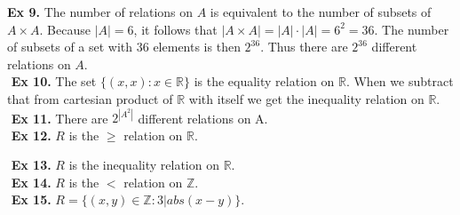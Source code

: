 \documentclass{article}
\begin{document}
\newpage
\noindent \textbf{Ex 9.} The number of relations on $A$ is equivalent to the number of subsets of $A \times A$. Because $|A|=6$, it follows that $|A \times A|=|A|\cdot{}|A|=6^2=36$. The number of subsets of a set with $36$ elements is then $2^{36}$. Thus there are $2^{36}$ different relations on $A$.\\
$ $\newline
\noindent \textbf{Ex 10.} The set $\{ (x,x) : x \in \mathbb{R} \}$ is the equality relation on $\mathbb{R}$. When we subtract that from cartesian product of $\mathbb{R}$ with itself we get the inequality relation on $\mathbb{R}$.\\
$ $\newline
\noindent \textbf{Ex 11.} There are $2^{|A^2|}$ different relations on A.\\
$ $\newline
\noindent \textbf{Ex 12.} $R$ is the $\geq$ relation on $\mathbb{R}$.

$ $\newline
\noindent \textbf{Ex 13.} $R$ is the inequality relation on $\mathbb{R}$.\\
$ $\newline
\noindent \textbf{Ex 14.} $R$ is the $<$ relation on $\mathbb{Z}$.\\
$ $\newline
\noindent \textbf{Ex 15.} $R = \{(x,y) \in \mathbb{Z} : 3|abs(x-y)\}$.
\end{document}

